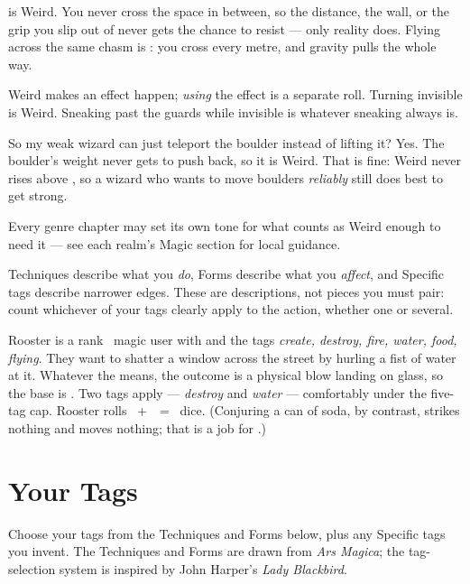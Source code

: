  is Weird. You never cross the space in between,
so the distance, the wall, or the grip you slip out of never gets the
chance to resist --- only reality does. Flying across the same chasm is
: you cross every metre, and gravity pulls the whole way.

Weird makes an effect happen; \emph{using} the effect is a separate roll.
Turning invisible is Weird. Sneaking past the guards while invisible is
whatever sneaking always is.

\begin{question}{So my weak wizard can just teleport the boulder instead of lifting it?}
Yes. The boulder's weight never gets to push back, so it is Weird. That is
fine: Weird never rises above , so a wizard who wants to move
boulders \emph{reliably} still does best to get strong.
\end{question}

Every genre chapter may set its own tone for what counts as Weird enough
to need it --- see each realm's Magic section for local guidance.

Techniques describe what you \emph{do}, Forms describe what you
\emph{affect}, and Specific tags describe narrower edges. These are
descriptions, not pieces you must pair: count whichever of your tags
clearly apply to the action, whether one or several.

\begin{example}
Rooster is a rank~ magic user with   and the
tags \emph{create, destroy, fire, water, food, flying}. They want to shatter
a window across the street by hurling a fist of water at it. Whatever the
means, the outcome is a physical blow landing on glass, so the base is
. Two tags apply --- \emph{destroy} and \emph{water} ---
comfortably under the five-tag cap. Rooster rolls
~+~~=~ dice. (Conjuring a can of soda, by contrast,
strikes nothing and moves nothing; that is a job for .)
\end{example}

\section{Your Tags}

Choose your tags from the Techniques and Forms below, plus any Specific
tags you invent. The Techniques and Forms are drawn from \emph{Ars Magica};
the tag-selection system is inspired by John Harper's \emph{Lady Blackbird}.

